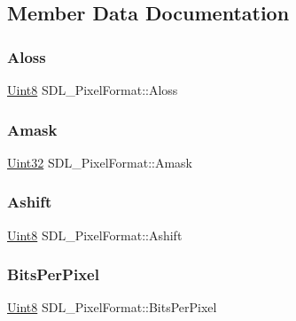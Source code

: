 \subsection{Member Data Documentation}
\mbox{\label{struct_s_d_l___pixel_format_a660e95097874088292f1289a458efaa2}} 
\subsubsection{\texorpdfstring{Aloss}{Aloss}}
{\footnotesize\ttfamily \mbox{\hyperlink{_s_d_l__stdinc_8h_a2944638813a090aa23e62f4da842c3e2}{Uint8}} S\+D\+L\+\_\+\+Pixel\+Format\+::\+Aloss}

\mbox{\label{struct_s_d_l___pixel_format_a6cdaf31f6cb153fefda47fa6b8368c0e}} 
\subsubsection{\texorpdfstring{Amask}{Amask}}
{\footnotesize\ttfamily \mbox{\hyperlink{_s_d_l__stdinc_8h_add440eff171ea5f55cb00c4a9ab8672d}{Uint32}} S\+D\+L\+\_\+\+Pixel\+Format\+::\+Amask}

\mbox{\label{struct_s_d_l___pixel_format_ac3c4ffa0de1f2c94040340deede3bf46}} 
\subsubsection{\texorpdfstring{Ashift}{Ashift}}
{\footnotesize\ttfamily \mbox{\hyperlink{_s_d_l__stdinc_8h_a2944638813a090aa23e62f4da842c3e2}{Uint8}} S\+D\+L\+\_\+\+Pixel\+Format\+::\+Ashift}

\mbox{\label{struct_s_d_l___pixel_format_aac533fae3043ef44df01108248e111d8}} 
\subsubsection{\texorpdfstring{BitsPerPixel}{BitsPerPixel}}
{\footnotesize\ttfamily \mbox{\hyperlink{_s_d_l__stdinc_8h_a2944638813a090aa23e62f4da842c3e2}{Uint8}} S\+D\+L\+\_\+\+Pixel\+Format\+::\+Bits\+Per\+Pixel}

